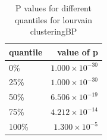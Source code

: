 \begin{table}[ht]
\centering
\begin{tabular}{lr}
  \hline
quantile & value of p \\ 
  \hline
0\% & $1.000 \times 10^{-30}$ \\ 
  25\% & $1.000 \times 10^{-30}$ \\ 
  50\% & $6.506 \times 10^{-19}$ \\ 
  75\% & $4.212 \times 10^{-14}$ \\ 
  100\% & $1.300 \times 10^{-5}$ \\ 
   \hline
\end{tabular}
\caption{P values for different quantiles for lourvain clusteringBP} 
\label{tabP values for different quantiles for lourvain clusteringBP}
\end{table}

